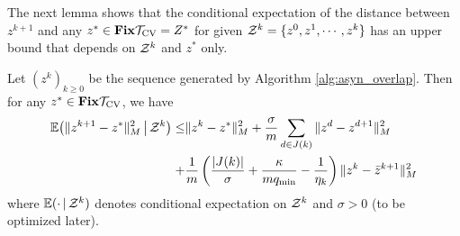 The next lemma shows that the conditional expectation of the distance between $z^{k+1}$ 
and any $z^*\in \mathbf{Fix} {{\mathcal{T}}_{\textnormal{CV}}}=Z^*$ for given ${\mathcal{Z}}^k=\{z^0,z^1,\cdots,z^k\}$ has an
upper bound that depends on ${\mathcal{Z}}^k$ and $z^*$ only.
\begin{lemma}\label{lemma:fund}
Let $(z^k)_{k\geq 0}$ be the sequence generated by Algorithm
\ref{alg:asyn_overlap}.  Then for
any $z^*\in \mathbf{Fix} {{\mathcal{T}}_{\textnormal{CV}}}$, we have
\begin{align}\label{eqn:fund_inquality0}
\begin{aligned}
\mathbb{E}\big(\|z^{k+1} - z^* \|_M^2 \,\big|\, \cZ^k\big)  \leq & \|z^{k} - z^*
\|_M^2  +{\sigma\over m}\sum_{d\in J(k)}\|z^d-z^{d+1}\|_M^2\\
+& {1\over m}\left({{|J(k)|}\over \sigma}+{\kappa\over
mq_{\min}}-{1\over \eta_k}\right)\|z^k-\bar z^{k+1}\|_M^2
\end{aligned}
\end{align}
where $\mathbb{E}(\cdot\,|\,{\mathcal{Z}}^k)$ denotes conditional  expectation  on ${\mathcal{Z}}^k$ and $\sigma>0$ (to be optimized later).
\end{lemma}
